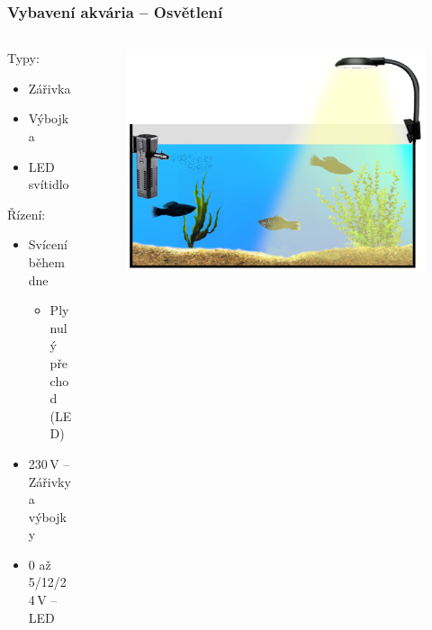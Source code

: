 \documentclass[%
  12pt,       				%
	t,                  %
	aspectratio=1610,   %
	unicode,						%
]{beamer}				    	%
\begin{document}
\begin{frame} 
	\frametitle{Vybavení akvária -- Osvětlení}
	
	\begin{columns}[T] 								%
		\begin{column}{0.4\textwidth}		%
			Typy:\\[2ex]
			\begin{itemize}
				\item Zářivka
				\item Výbojka
				\item LED svítidlo
			\end{itemize}

			\vspace{4ex}%
			Řízení:\\[2ex]
			\begin{itemize}
				\item Svícení během dne 
				\begin{itemize}
					\item Plynulý přechod (LED)
				\end{itemize}
				\item 230\,V -- Zářivky a výbojky
				\item 0 až 5/12/24\,V -- LED
			\end{itemize}
		\end{column}
		\begin{column}{0.6\textwidth}		%
			\begin{figure}%
				\centering
				\includegraphics[width=\columnwidth]{obrazky/prezentace/vybaveni-akvaria/04-svetlo.png}
			\end{figure}
		\end{column}
	\end{columns}											%
\end{frame}
\end{document}
